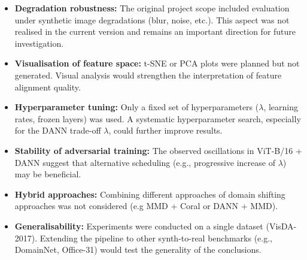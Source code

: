 \documentclass[a4paper,12pt]{extarticle}
\begin{document}
\begin{itemize}
	\item \textbf{Degradation robustness:} The original project scope included evaluation under synthetic image degradations
	      (blur, noise, etc.). This aspect was not realised in the current version and remains an important direction
	      for future investigation.
	\item \textbf{Visualisation of feature space:} t-SNE or PCA plots were planned but not generated. Visual analysis
	      would strengthen the interpretation of feature alignment quality.
	\item \textbf{Hyperparameter tuning:} Only a fixed set of hyperparameters ($\lambda$, learning rates, frozen layers) was used.
	      A systematic hyperparameter search, especially for the DANN trade-off $\lambda$, could further improve results.
	\item \textbf{Stability of adversarial training:} The observed oscillations in ViT-B/16 + DANN suggest that
	      alternative scheduling (e.g., progressive increase of $\lambda$) may be beneficial.
	\item \textbf{Hybrid approaches:} Combining different approaches of domain shifting approaches was not considered (e.g MMD + Coral or DANN + MMD).
	\item \textbf{Generalisability:} Experiments were conducted on a single dataset (VisDA-2017). Extending the pipeline
	      to other synth-to-real benchmarks (e.g., DomainNet, Office-31) would test the generality of the conclusions.
\end{itemize}

\newpage
\printbibliography[heading=bibintoc]
\end{document}
